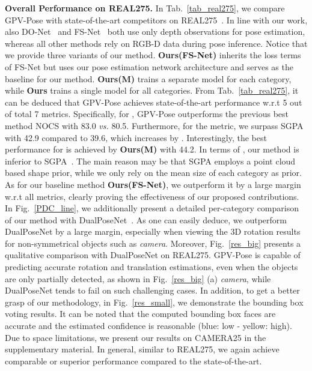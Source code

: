\documentclass[10pt,twocolumn,letterpaper]{article}
\begin{document}
\textbf{Overall Performance on REAL275.}
In Tab.~\ref{tab_real275}, we compare GPV-Pose with state-of-the-art competitors on REAL275~\cite{NOCS}. 
In line with our work, also DO-Net~\cite{donet} and FS-Net~\cite{fs-net} both use only depth observations for pose estimation, whereas all other methods rely on RGB-D data during pose inference.
Notice that we provide three variants of our method.
\textbf{Ours(FS-Net)} inherits the loss terms of FS-Net but uses our pose estimation network architecture and serves as the baseline for our method.
\textbf{Ours(M)} trains a separate model for each category, while \textbf{Ours} trains a single model for all categories.
From Tab.~\ref{tab_real275}, it can be deduced that GPV-Pose achieves state-of-the-art performance w.r.t 5 out of total 7 metrics.
Specifically, for , GPV-Pose outperforms the previous best method NOCS with 83.0 \textit{vs.} 80.5. Furthermore, for the  metric, we surpass SGPA~\cite{sgpa} with 42.9 compared to 39.6, which increases by .
Interestingly, the best performance for  is achieved by \textbf{Ours(M)} with 44.2.
In terms of , our method is inferior to SGPA~\cite{sgpa}.
The main reason may be that SGPA employs a point cloud based shape prior, while we only rely on the mean size of each category as prior.
As for our baseline method \textbf{Ours(FS-Net)}, we outperform it by a large margin w.r.t all metrics, clearly proving the effectiveness of our proposed contributions.
In Fig.~\ref{PDC_line}, we additionally present a detailed per-category comparison of our method with DualPoseNet~\cite{dualposenet}.
As one can easily deduce, we outperform DualPoseNet by a large margin, especially when viewing the 3D rotation results for non-symmetrical objects such as \textit{camera}. 
Moreover, Fig.~\ref{res_big} presents a qualitative comparison with DualPoseNet on REAL275.
GPV-Pose is capable of predicting accurate rotation and translation estimations, even when the objects are only partially detected, as shown in Fig.~\ref{res_big} (a) \textit{camera}, 
while DualPoseNet tends to fail on such challenging cases.
In addition, to get a better grasp of our methodology, in Fig.~\ref{res_small}, we demonstrate the bounding box voting results. It can be noted that the computed bounding box faces are accurate and the estimated confidence is reasonable (blue: low - yellow: high). 
Due to space limitations, we present our results on CAMERA25 in the supplementary material. In general, similar to REAL275, we again achieve comparable or superior performance compared to the state-of-the-art.
\end{document}
